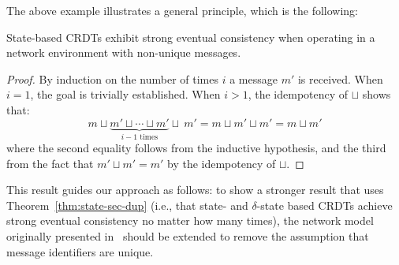 The above example illustrates a general principle, which is the following:
\begin{theorem} \label{thm:state-sec-dup}
  State-based CRDTs exhibit strong eventual consistency when operating in a
  network environment with non-unique messages.
\end{theorem}
\begin{proof}
  By induction on the number of times $i$ a message $m'$ is received. When $i =
  1$, the goal is trivially established. When $i > 1$, the idempotency of
  $\sqcup$ shows that:
  \[
    m \sqcup \underbrace{m' \sqcup \cdots \sqcup m'}_{\text{$i-1$ times}} \sqcup~m'
      = m \sqcup m' \sqcup m'
      = m \sqcup m'
  \]
  where the second equality follows from the inductive hypothesis, and the third
  from the fact that $m' \sqcup m' = m'$ by the idempotency of $\sqcup$.
\end{proof}

This result guides our approach as follows: to show a stronger result that uses
Theorem~\ref{thm:state-sec-dup} (i.e., that state- and $\delta$-state based
CRDTs achieve strong eventual consistency no matter how many times), the network
model originally presented in~\citep{gomes17} should be extended to remove the
assumption that message identifiers are unique.

